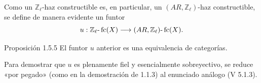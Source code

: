 Como un \(\mathbb Z_\ell\)-haz constructible es, en particular, un \((AR,\mathbb Z_\ell)\)-haz constructible, se define de manera evidente un funtor
\[
u:\mathbb Z_\ell\text{-}\operatorname{fc}(X)\longrightarrow (AR,\mathbb Z_\ell)\text{-}\operatorname{fc}(X).
\]

\begin{statement}{Proposición 1.5.5}
El funtor \(u\) anterior es una equivalencia de categorías.
\end{statement}

\begin{prooftext}[Demostración]
Para demostrar que \(u\) es plenamente fiel y esencialmente sobreyectivo, se reduce «por pegado» (como en la demostración de 1.1.3) al enunciado análogo (V 5.1.3).
\end{prooftext}
